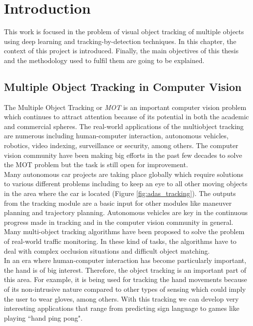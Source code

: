 \chapter{Introduction}\label{cap.introduccion}
\setlength{\parindent}{0pt}
This work is focused in the problem of visual object tracking of multiple objects using deep learning and tracking-by-detection techniques. In this chapter, the context of this project is introduced. Finally, the main objectives of this thesis and the methodology used to fulfil them are going to be explained.

\section{Multiple Object Tracking in Computer Vision}
The Multiple Object Tracking or \textit{MOT} is an important computer vision problem which continues to attract attention because of its potential in both the academic and commercial spheres. The real-world applications of the multiobject tracking are numerous including human-computer interaction, autonomous vehicles, robotics, video indexing, surveillance or security, among others. The computer vision community have been making big efforts in the past few decades to solve the MOT problem but the task is still open for improvement.\\ Many autonomous car projects are taking place globally which require solutions to various different problems including to keep an eye to all other moving objects in the area where the car is located (Figure \ref{fig:adas_tracking}). The outputs from the tracking module are a basic input for other modules like maneuver planning and trajectory planning. Autonomous vehicles are key in the continuous progress made in tracking and in the computer vision community in general. Many multi-object tracking algorithms have been proposed to solve the problem of real-world traffic monitoring. In these kind of tasks, the algorithms have to deal with complex occlusion situations and difficult object matching.\\
In an era where human-computer interaction has become particularly important, the hand is of big interest. Therefore, the object tracking is an important part of this area. For example, it is being used for tracking the hand movements because of its non-intrusive nature compared to other types of sensing which could imply the user to wear gloves, among others. With this tracking we can develop very interesting applications that range from predicting sign language to games like playing ``hand ping pong".
